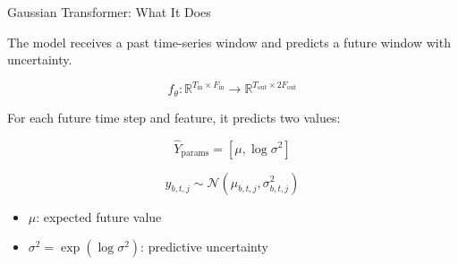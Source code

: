 \begin{frame}[allowframebreaks]{Gaussian Transformer: What It Does}
    \small
    
    The model receives a past time-series window and predicts a future window with uncertainty.
    
    \vspace{0.3cm}
    
    \[
        f_{\theta}:
        \mathbb{R}^{T_{\mathrm{in}} \times F_{\mathrm{in}}}
        \rightarrow
        \mathbb{R}^{T_{\mathrm{out}} \times 2F_{\mathrm{out}}}
    \]
    
    \vspace{0.2cm}
    
    For each future time step and feature, it predicts two values:
    
    \[
        \hat{Y}_{\mathrm{params}}
        =
        [
        \mu,
        \log \sigma^2
        ]
    \]
    
    \vspace{0.2cm}
    
    \[
        y_{b,t,j}
        \sim
        \mathcal{N}
        (
        \mu_{b,t,j},
        \sigma^2_{b,t,j}
        )
    \]
    
    \vspace{0.2cm}
    
    \begin{itemize}
        \item \(\mu\): expected future value
        \item \(\sigma^2 = \exp(\log \sigma^2)\): predictive uncertainty
    \end{itemize}
\end{frame}




